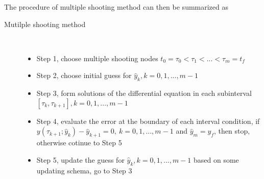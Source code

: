 The procedure of multiple shooting method can then be summarized as
\begin{description}
	\item[Mutilple shooting method] \
	\begin{itemize}
		\item Step 1, choose multiple shooting nodes $t_0 = \tau_0 < \tau_1 < ... < \tau_m = t_f$ 
		\item Step 2, choose initial guess for $\hat{y}_k, k = 0, 1, ..., m-1$ 
		\item Step 3, form solutions of the differential equation in each subinterval $[\tau_k, \tau_{k+1}], k = 0, 1, ..., m-1$
		\item Step 4, evaluate the error at the boundary of each interval condition, if $y(\tau_{k+1}; \hat{y}_k) - \hat{y}_{k+1} = 0, \  k = 0, 1, ..., m-1$ and $\hat{y}_{m} = y_f$, then stop, otherwise cotinue to Step 5
		\item Step 5, update the guess for $\hat{y}_k, k = 0, 1, ..., m-1$ based on some updating schema, go to Step 3
	\end{itemize}
\end{description}






